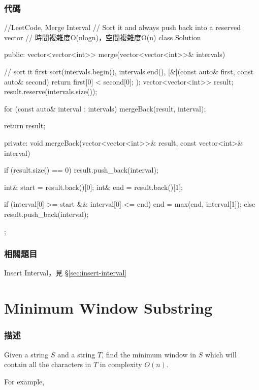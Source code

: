 \subsubsection{代碼}
\begin{Code}
//LeetCode, Merge Interval
// Sort it and always push back into a reserved vector
// 時間複雜度O(nlogn)，空間複雜度O(n)
class Solution {
public:
    vector<vector<int>> merge(vector<vector<int>>& intervals) {
        // sort it first
        sort(intervals.begin(), intervals.end(), [&](const auto& first, const auto& second)
             {
                return first[0] < second[0]; 
             });
        vector<vector<int>> result;
        result.reserve(intervals.size());
        
        for (const auto& interval : intervals)
            mergeBack(result, interval);
        
        return result;
    }
private:
    void mergeBack(vector<vector<int>>& result, const vector<int>& interval) {
        if (result.size() == 0) result.push_back(interval);
        
        int& start = result.back()[0];
        int& end = result.back()[1];
        
        if (interval[0] >= start && interval[0] <= end)
            end = max(end, interval[1]);
        else
            result.push_back(interval);
    }
};
\end{Code}


\subsubsection{相關題目}

\begindot
\item Insert Interval，見 \S \ref{sec:insert-interval}
\myenddot


\section{Minimum Window Substring} %
\label{sec:minimum-window-substring}


\subsubsection{描述}
Given a string $S$ and a string $T$, find the minimum window in $S$ which will contain all the characters in $T$ in complexity $O(n)$.

For example, 

